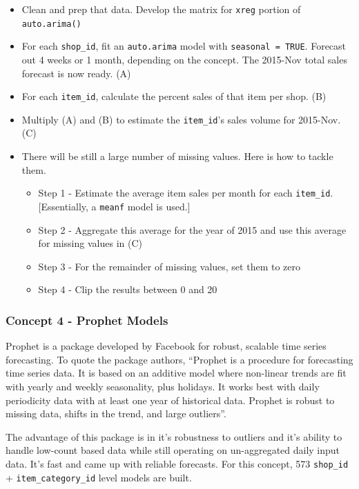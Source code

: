 \documentclass[floatsintext,man]{apa6}
\providecommand{\tightlist}{%
  \setlength{\itemsep}{0pt}\setlength{\parskip}{0pt}}
\theoremstyle{definition}
\theoremstyle{definition}
\theoremstyle{definition}
\theoremstyle{remark}
\begin{document}
\begin{itemize}
\tightlist
\item
  Clean and prep that data. Develop the matrix for \texttt{xreg} portion
  of \texttt{auto.arima()}
\item
  For each \texttt{shop\_id}, fit an \texttt{auto.arima} model with
  \texttt{seasonal\ =\ TRUE}. Forecast out 4 weeks or 1 month, depending
  on the concept. The 2015-Nov total sales forecast is now ready. (A)
\item
  For each \texttt{item\_id}, calculate the percent sales of that item
  per shop. (B)
\item
  Multiply (A) and (B) to estimate the \texttt{item\_id}'s sales volume
  for 2015-Nov. (C)
\item
  There will be still a large number of missing values. Here is how to
  tackle them.

  \begin{itemize}
  \tightlist
  \item
    Step 1 - Estimate the average item sales per month for each
    \texttt{item\_id}. {[}Essentially, a \texttt{meanf} model is
    used.{]}
  \item
    Step 2 - Aggregate this average for the year of 2015 and use this
    average for missing values in (C)
  \item
    Step 3 - For the remainder of missing values, set them to zero
  \item
    Step 4 - Clip the results between 0 and 20
  \end{itemize}
\end{itemize}

\subsubsection{Concept 4 - Prophet
Models}\label{concept-4---prophet-models}

Prophet is a package developed by Facebook for robust, scalable time
series forecasting. To quote the package authors, \enquote{Prophet is a
procedure for forecasting time series data. It is based on an additive
model where non-linear trends are fit with yearly and weekly
seasonality, plus holidays. It works best with daily periodicity data
with at least one year of historical data. Prophet is robust to missing
data, shifts in the trend, and large outliers}.

The advantage of this package is in it's robustness to outliers and it's
ability to handle low-count based data while still operating on
un-aggregated daily input data. It's fast and came up with reliable
forecasts. For this concept, 573 \texttt{shop\_id} +
\texttt{item\_category\_id} level models are built.
\end{document}

